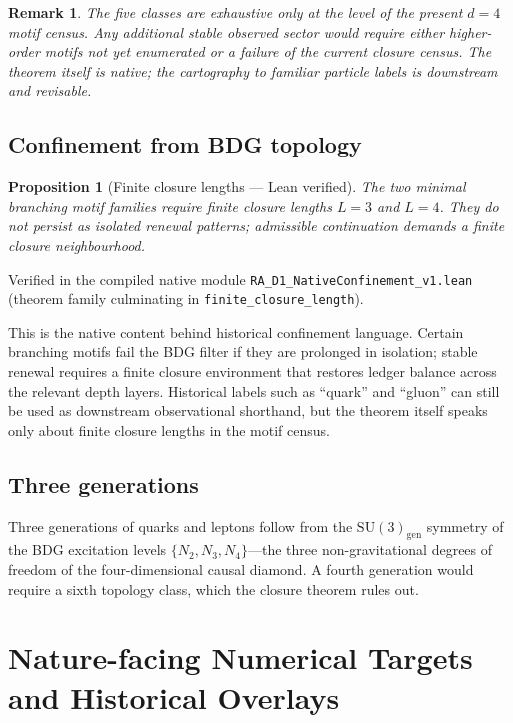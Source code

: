 \documentclass[11pt]{article}
\newtheorem{proposition}{Proposition}
\newtheorem{remark}{Remark}
\begin{document}
\begin{remark}
The five classes are exhaustive only at the level of the present $d=4$ motif census. Any additional stable observed sector would require either higher-order motifs not yet enumerated or a failure of the current closure census. The theorem itself is native; the cartography to familiar particle labels is downstream and revisable.
\end{remark}

\subsection{Confinement from BDG topology}

\begin{proposition}[Finite closure lengths --- Lean verified]
\label{prop:confinement}
The two minimal branching motif families require finite closure lengths $L=3$ and $L=4$. They do not persist as isolated renewal patterns; admissible continuation demands a finite closure neighbourhood.
\end{proposition}

Verified in the compiled native module \texttt{RA\_D1\_NativeConfinement\_v1.lean} (theorem family culminating in \texttt{finite\_closure\_length}).

This is the native content behind historical confinement language. Certain branching motifs fail the BDG filter if they are prolonged in isolation; stable renewal requires a finite closure environment that restores ledger balance across the relevant depth layers. Historical labels such as ``quark'' and ``gluon'' can still be used as downstream observational shorthand, but the theorem itself speaks only about finite closure lengths in the motif census.

\subsection{Three generations}

Three generations of quarks and leptons follow from the $\mathrm{SU}(3)_{\mathrm{gen}}$ symmetry of the BDG excitation levels $\{N_2,N_3,N_4\}$---the three non-gravitational degrees of freedom of the four-dimensional causal diamond. A fourth generation would require a sixth topology class, which the closure theorem rules out.

\section{Nature-facing Numerical Targets and Historical Overlays}
\end{document}
